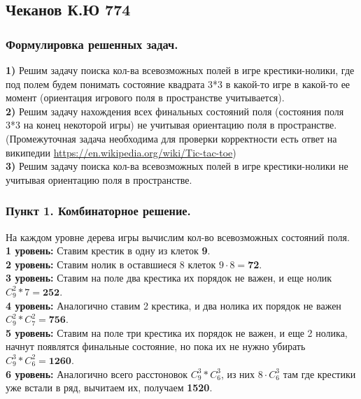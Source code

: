 \documentclass[12pt,a4paper]{scrartcl}
\begin{document}
\subsection*{Чеканов К.Ю 774}
\subsubsection*{Формулировка решенных задач.}
\textbf{1)} Решим задачу поиска кол-ва всевозможных полей в игре крестики-нолики, где под полем будем понимать состояние квадрата 3*3 в какой-то игре в какой-то ее момент (ориентация игрового поля в пространстве учитывается).\\

\textbf{2)} Решим задачу нахождения всех финальных состояний поля (состояния поля 3*3 на конец некоторой игры) не учитывая ориентацию поля в пространстве. (Промежуточная задача необходима для проверки корректности есть ответ на википедии \url{https://en.wikipedia.org/wiki/Tic-tac-toe})\\

\textbf{3)} Решим задачу поиска кол-ва всевозможных полей в игре крестики-нолики не учитывая ориентацию поля в пространстве.

\subsubsection*{Пункт 1. Комбинаторное решение.}
На каждом уровне дерева игры вычислим кол-во всевозможных состояний поля.\\

\textbf{1 уровень:} Ставим крестик в одну из клеток \textbf{9}.\\

\textbf{2 уровень:} Ставим нолик в оставшиеся 8 клеток $9\cdot8 = $\textbf{72}.\\

\textbf{3 уровень:} Ставим на поле два крестика их порядок не важен, и еще нолик $C_9^2*7 = \textbf{252}$.\\

\textbf{4 уровень:} Аналогично ставим 2 крестика, и два нолика их порядок не важен $C_9^2*C_7^2 = \textbf{756}$.\\

\textbf{5 уровень:} Ставим на поле три крестика их порядок не важен, и еще 2 нолика, начнут появлятся финальные состояние, но пока их не нужно убирать $C_9^3*C_6^2 = \textbf{1260}$.\\

\textbf{6 уровень:} Аналогично всего расстоновок $C_9^3*C_6^3$, из них $8\cdot C_6^3$ там где крестики уже встали в ряд, вычитаем их, получаем \textbf{1520}. \\
\end{document}

